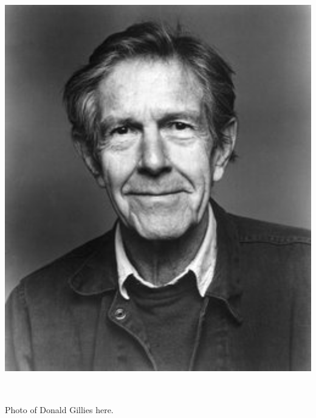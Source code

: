 \documentclass[17pt]{extarticle}
\begin{document}
\newpage

\begin{center}
  \includegraphics[height=7in]{images/john-cage-portrait.jpg}
\end{center}

\newpage


\vspace*{2in}
{\Huge

  \begin{center}

    Photo of Donald Gillies here.

    \end{center}

}

\newpage
\end{document}
